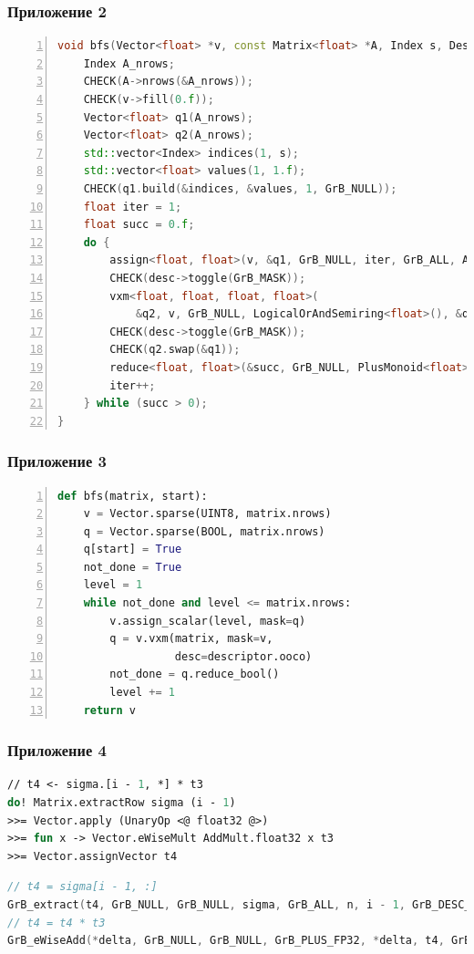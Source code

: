 \documentclass{beamer}
\begin{document}
\begin{frame}[fragile]
  \frametitle{Приложение 2}
  \begin{lstlisting}[language=c++, caption=Реализация поиска в ширину в GraphBLAST, basicstyle=\tiny, numbers=left, numberstyle={\tiny \color{black}}, xleftmargin=5.0ex]
void bfs(Vector<float> *v, const Matrix<float> *A, Index s, Descriptor *desc){
    Index A_nrows;
    CHECK(A->nrows(&A_nrows));
    CHECK(v->fill(0.f));
    Vector<float> q1(A_nrows);
    Vector<float> q2(A_nrows);
    std::vector<Index> indices(1, s);
    std::vector<float> values(1, 1.f);
    CHECK(q1.build(&indices, &values, 1, GrB_NULL));
    float iter = 1;
    float succ = 0.f;
    do {
        assign<float, float>(v, &q1, GrB_NULL, iter, GrB_ALL, A_nrows, desc);
        CHECK(desc->toggle(GrB_MASK));
        vxm<float, float, float, float>(
            &q2, v, GrB_NULL, LogicalOrAndSemiring<float>(), &q1, A, desc);
        CHECK(desc->toggle(GrB_MASK));
        CHECK(q2.swap(&q1));
        reduce<float, float>(&succ, GrB_NULL, PlusMonoid<float>(), &q1, desc);
        iter++;
    } while (succ > 0);
}
  \end{lstlisting}
\end{frame}

\begin{frame}[fragile]
  \frametitle{Приложение 3}
  \begin{lstlisting}[language=Python, caption=Реализация поиска в ширину в pygraphblas, basicstyle=\tiny, numbers=left, numberstyle={\tiny \color{black}}, xleftmargin=5.0ex]
def bfs(matrix, start):
    v = Vector.sparse(UINT8, matrix.nrows)  
    q = Vector.sparse(BOOL, matrix.nrows)    
    q[start] = True
    not_done = True
    level = 1
    while not_done and level <= matrix.nrows:
        v.assign_scalar(level, mask=q)          
        q = v.vxm(matrix, mask=v, 
                  desc=descriptor.ooco)         
        not_done = q.reduce_bool()              
        level += 1                              
    return v
  \end{lstlisting}
\end{frame}

\begin{frame}[fragile]
  \frametitle{Приложение 4}
  \begin{lstlisting}[language=ml, caption=GraphBLAS-sharp, basicstyle=\tiny]
// t4 <- sigma.[i - 1, *] * t3
do! Matrix.extractRow sigma (i - 1)
>>= Vector.apply (UnaryOp <@ float32 @>)
>>= fun x -> Vector.eWiseMult AddMult.float32 x t3
>>= Vector.assignVector t4
  \end{lstlisting}
  
  \begin{lstlisting}[language=c, caption=SuiteSparse GraphBLAS, basicstyle=\tiny]
// t4 = sigma[i - 1, :]
GrB_extract(t4, GrB_NULL, GrB_NULL, sigma, GrB_ALL, n, i - 1, GrB_DESC_T0);
// t4 = t4 * t3
GrB_eWiseAdd(*delta, GrB_NULL, GrB_NULL, GrB_PLUS_FP32, *delta, t4, GrB_NULL);
  \end{lstlisting}
\end{frame}
\end{document}
